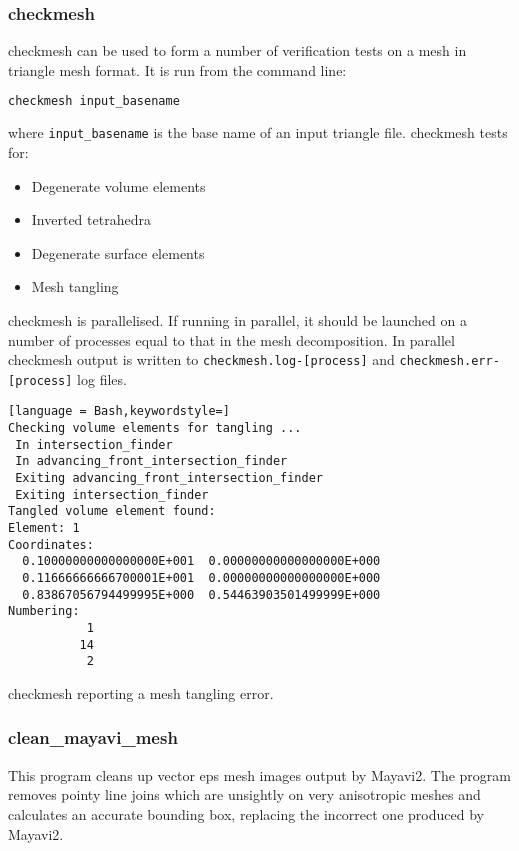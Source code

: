 \subsubsection{checkmesh}
\label{sec:checkmesh}
checkmesh can be used to form a number of verification tests on a mesh in triangle mesh
format. It is run from the command line:
\begin{lstlisting}[language = Bash]
checkmesh input_basename
\end{lstlisting}
where \lstinline[language = Bash]+input_basename+ is the base name of an input triangle file. checkmesh tests for:
\begin{itemize}
\item Degenerate volume elements
\item Inverted tetrahedra
\item Degenerate surface elements
\item Mesh tangling
\end{itemize}

checkmesh is parallelised. If running in parallel, it should be launched on a number of processes equal to that in the mesh decomposition. In parallel checkmesh output is written to
\lstinline[language = Bash]+checkmesh.log-[process]+ and \lstinline[language = Bash]+checkmesh.err-[process]+ log files.

\begin{example}
\begin{lstlisting}[language = Bash,keywordstyle=]
Checking volume elements for tangling ...
 In intersection_finder
 In advancing_front_intersection_finder
 Exiting advancing_front_intersection_finder
 Exiting intersection_finder
Tangled volume element found: 
Element: 1
Coordinates:
  0.10000000000000000E+001  0.00000000000000000E+000
  0.11666666666700001E+001  0.00000000000000000E+000
  0.83867056794499995E+000  0.54463903501499999E+000
Numbering:
           1
          14
           2
\end{lstlisting}
\caption{checkmesh reporting a mesh tangling error.}
\end{example}


\subsubsection{clean\_mayavi\_mesh}
\label{sec:clean_mayavi_mesh}

This program cleans up vector eps mesh images output by Mayavi2. The program
removes pointy line joins which are unsightly on very anisotropic meshes and
calculates an accurate bounding box, replacing the incorrect one produced by Mayavi2.

